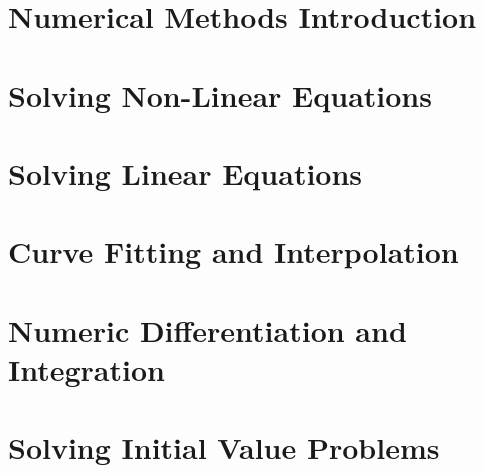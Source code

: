 \documentclass{tufte-book}
\theoremstyle{break}
\begin{document}

\part{Numerical Methods Introduction}




\part{Solving Non-Linear Equations}







\part{Solving Linear Equations}










\part{Curve Fitting and Interpolation}






\part{Numeric Differentiation and Integration}









\part{Solving Initial Value Problems}




\end{document}
